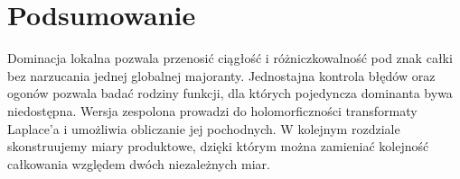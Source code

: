\section{Podsumowanie}
Dominacja lokalna pozwala przenosić ciągłość i
różniczkowalność pod znak całki bez narzucania
jednej globalnej majoranty. Jednostajna kontrola
błędów oraz ogonów pozwala badać rodziny funkcji,
dla których pojedyncza dominanta bywa niedostępna.
Wersja zespolona prowadzi do holomorficzności
transformaty Laplace'a i umożliwia obliczanie jej
pochodnych. W kolejnym rozdziale skonstruujemy
miary produktowe, dzięki którym można zamieniać
kolejność całkowania względem dwóch niezależnych
miar.
